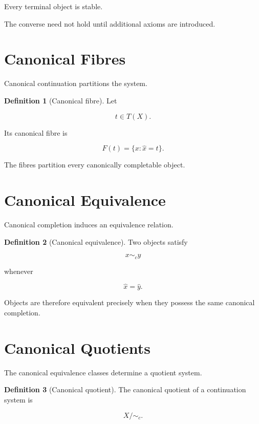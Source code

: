 \documentclass[13pt,openany]{book}
\theoremstyle{plain}
\theoremstyle{definition}
\newtheorem{definition}{Definition}[chapter]
\begin{document}
Every terminal object is stable.

The converse need not hold until additional axioms are introduced.


\section{Canonical Fibres}

Canonical continuation partitions the system.

\begin{definition}[Canonical fibre]
Let

\[
t\in T(X).
\]

Its canonical fibre is

\[
F(t)
=
\{
x:
\widehat{x}=t
\}.
\]
\end{definition}

The fibres partition every canonically completable object.


\section{Canonical Equivalence}

Canonical completion induces an equivalence relation.

\begin{definition}[Canonical equivalence]
Two objects satisfy

\[
x\sim_c y
\]

whenever

\[
\widehat{x}
=
\widehat{y}.
\]
\end{definition}

Objects are therefore equivalent precisely when they possess the same canonical
completion.


\section{Canonical Quotients}

The canonical equivalence classes determine a quotient system.

\begin{definition}[Canonical quotient]
The canonical quotient of a continuation system is

\[
X/{\sim_c}.
\]
\end{definition}
\end{document}
